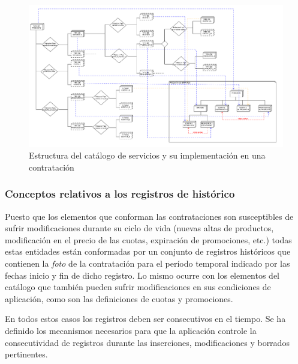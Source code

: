 \begin{figure}[H]
  \centering
  \includegraphics[width=\textwidth]{imaxes/estructura-catalogo.png}
  \caption{Estructura del catálogo de servicios y su implementación en una contratación}
  \label{fig:estructura-catalogo-chap-teoria}
\end{figure}





\subsubsection{Conceptos relativos a los registros de histórico}
\label{sub:histórico-conceptos-chap-teoria}

Puesto que los elementos que conforman las contrataciones son susceptibles de sufrir modificaciones durante su ciclo de vida (nuevas altas de productos, modificación en el precio de las cuotas, expiración de promociones, etc.) todas estas entidades están conformadas por un conjunto de registros históricos que contienen la \textit{foto} de la contratación para el período temporal indicado por las fechas inicio y fin de dicho registro. Lo mismo ocurre con los elementos del catálogo que también pueden sufrir modificaciones en sus condiciones de aplicación, como son las definiciones de cuotas y promociones.

En todos estos casos los registros deben ser consecutivos en el tiempo. Se ha definido los mecanismos necesarios para que la aplicación controle la consecutividad de registros durante las inserciones, modificaciones y borrados pertinentes.